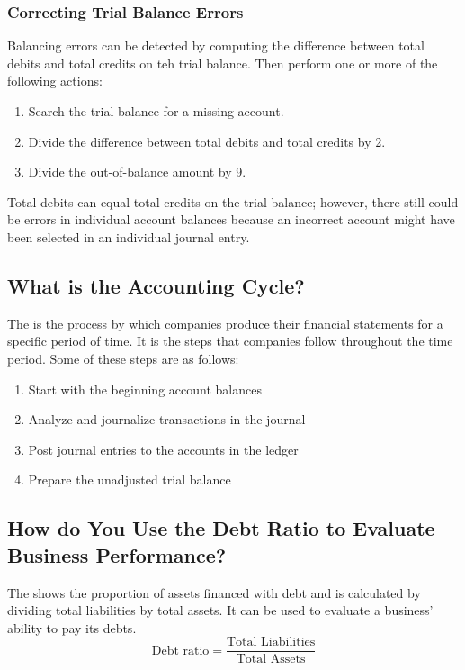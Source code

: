 \documentclass{article}
\begin{document}
\subsubsection{Correcting Trial Balance Errors}

Balancing errors can be detected by computing the difference between total debits and total credits on teh trial balance. Then perform one or more of the following actions: 
\begin{enumerate}
  \item Search the trial balance for a missing account. 
  \item Divide the difference between total debits and total credits by 2. 
  \item Divide the out-of-balance amount by 9. 
\end{enumerate}
Total debits can equal total credits on the trial balance; however, there still could be errors in individual account balances because an incorrect account might have been selected in an individual journal entry. 

\subsection{What is the Accounting Cycle?}

The  is the process by which companies produce their financial statements for a specific period of time. It is the steps that companies follow throughout the time period. Some of these steps are as follows: 
\begin{enumerate}
  \item Start with the beginning account balances 
  \item Analyze and journalize transactions in the journal 
  \item Post journal entries to the accounts in the ledger 
  \item Prepare the unadjusted trial balance 
\end{enumerate}

\subsection{How do You Use the Debt Ratio to Evaluate Business Performance?}

The  shows the proportion of assets financed with debt and is calculated by dividing total liabilities by total assets. It can be used to evaluate a business' ability to pay its debts. $$\textrm{Debt ratio} = \frac{\textrm{Total Liabilities}}{\textrm{Total Assets}}$$
\end{document}
